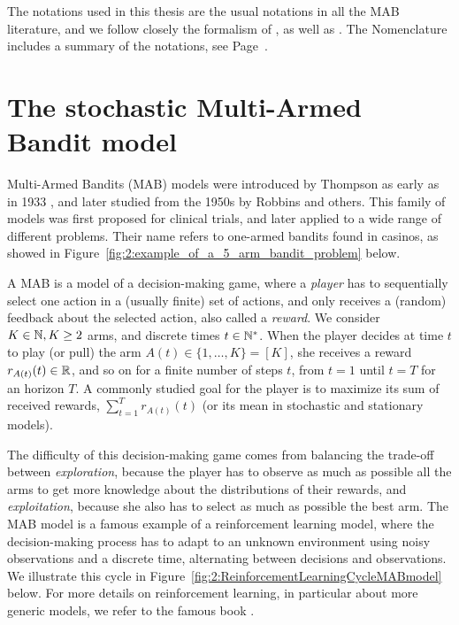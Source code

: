 The notations used in this thesis are the usual notations in all the MAB literature, and we follow closely the formalism of \cite{Kaufmann12PhD}, as well as \cite{Slivkins2019,LattimoreBanditAlgorithmsBook,Bubeck12}.
The Nomenclature includes a summary of the notations, see Page~\pageref{chapter:nomenclature}.


\newpage
\graphicspath{{2-Chapters/2-Chapter/Images/}}


\section{The stochastic Multi-Armed Bandit model}
\label{sec:2:notations}


Multi-Armed Bandits (MAB) models were introduced by Thompson as early as in 1933 \cite{Thompson33}, and later studied from the 1950s by Robbins \cite{Robbins52} and others.
This family of models was first proposed for clinical trials, and later applied to a wide range of different problems.
Their name refers to one-armed bandits found in casinos, as showed in Figure~\ref{fig:2:example_of_a_5_arm_bandit_problem} below.


A MAB is a model of a decision-making game, where a \emph{player} has to sequentially select one action in a (usually finite) set of actions, and only receives a (random) feedback about the selected action, also called a \emph{reward}.
We consider $K\in\mathbb{N}, K\geq2$ arms, and discrete times $t\in\mathbb{N}^*$.
When the player decides at time $t$ to play (or pull) the arm $A(t)\in\{1,\dots,K\}=[K]$, she receives a reward $r_{A(t)}(t)\in\mathbb{R}$, and so on for a finite number of steps $t$, from $t=1$ until $t=T$ for an horizon $T$.
%
A commonly studied goal for the player is to maximize its sum of received rewards, $\sum_{t=1}^T r_{A(t)}(t)$
(or its mean in stochastic and stationary models).


The difficulty of this decision-making game comes from balancing the trade-off between \emph{exploration}, because the player has to observe as much as possible all the arms to get more knowledge about the distributions of their rewards, and \emph{exploitation}, because she also has to select as much as possible the best arm.
The MAB model is a famous example of a reinforcement learning model, where the decision-making process has to adapt to an unknown environment using noisy observations and a discrete time, alternating between decisions and observations.
We illustrate this cycle in Figure~\ref{fig:2:ReinforcementLearningCycleMABmodel} below.
For more details on reinforcement learning, in particular about more generic models, we refer to the famous book \cite{SuttonBarto2018}.


